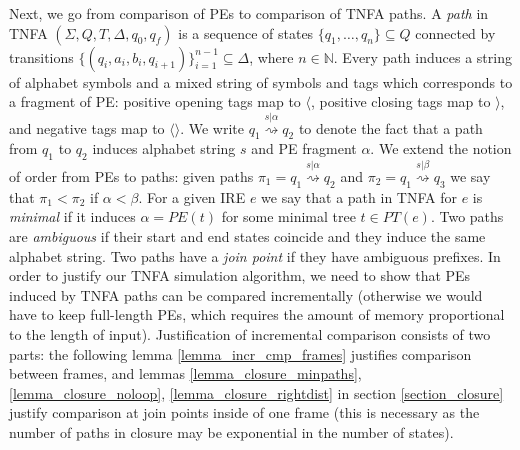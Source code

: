 \documentclass[AMA,STIX1COL]{WileyNJD-v2}
\newcommand{\Xl}{\langle}
\newcommand{\Xr}{\rangle}
\newcommand{\Xm}{\langle\!\rangle}
\newcommand{\YN}{\mathbb{N}}
\newcommand{\PT}{PT}
\newcommand{\PE}{P\!E}
\begin{document}
Next, we go from comparison of PEs to comparison of TNFA paths.
%
A \emph{path} in TNFA $(\Sigma, Q, T, \Delta, q_0, q_f)$
is a sequence of states $\{q_1, \hdots, q_n\} \subseteq Q$
connected by transitions $\{(q_i, a_i, b_i, q_{i + 1})\}_{i=1}^{n-1} \subseteq \Delta$, where $n \in \YN$.
%
Every path induces a string of alphabet symbols
and a mixed string of symbols and tags which corresponds to a fragment of PE:
positive opening tags map to $\Xl$,
positive closing tags map to $\Xr$,
and negative tags map to $\Xm$.
We write $q_1 \overset {s|\alpha} {\rightsquigarrow} q_2$
to denote the fact that a path from $q_1$ to $q_2$ induces alphabet string $s$ and PE fragment $\alpha$.
%
We extend the notion of order from PEs to paths: given paths
$\pi_1 = q_1 \overset {s|\alpha} {\rightsquigarrow} q_2$ and
$\pi_2 = q_1 \overset {s|\beta} {\rightsquigarrow} q_3$
we say that $\pi_1 < \pi_2$ if $\alpha < \beta$.
%
For a given IRE $e$ we say that a path in TNFA for $e$ is \emph{minimal} if it induces
$\alpha = \PE(t)$ for some minimal tree $t \in \PT(e)$.
%
Two paths are \emph{ambiguous} if their start and end states coincide and they induce the same alphabet string.
Two paths have a \emph{join point} if they have ambiguous prefixes.
%
In order to justify our TNFA simulation algorithm,
we need to show that PEs induced by TNFA paths can be compared incrementally
(otherwise we would have to keep full-length PEs, which requires the amount of memory proportional to the length of input).
Justification of incremental comparison consists of two parts:
the following lemma \ref{lemma_incr_cmp_frames} justifies comparison between frames,
and lemmas \ref{lemma_closure_minpaths}, \ref{lemma_closure_noloop}, \ref{lemma_closure_rightdist}
in section \ref{section_closure} justify comparison at join points inside of one frame
(this is necessary as the number of paths in closure may be exponential in the number of states).
\end{document}
